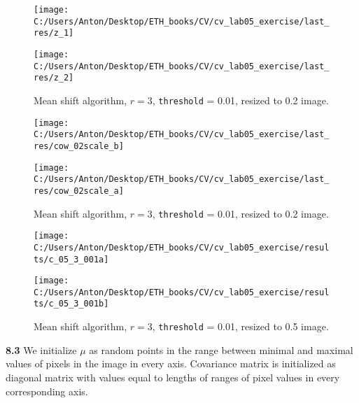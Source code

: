 \documentclass{report}
\begin{document}
\begin{figure}[h!]
	\begin{center}
		\begin{minipage}[h]{0.49\linewidth}
			\texttt{[image: C:/Users/Anton/Desktop/ETH\_books/CV/cv\_lab05\_exercise/last\_res/z\_1]}
			
		\end{minipage}
		\hfill
		\begin{minipage}[h]{0.49\linewidth}
			\texttt{[image: C:/Users/Anton/Desktop/ETH\_books/CV/cv\_lab05\_exercise/last\_res/z\_2]}
			
		\end{minipage}
	\caption{Mean shift algorithm, $r=3$, \texttt{threshold} = 0.01, resized to 0.2 image.}
	\end{center}
\end{figure}
\begin{figure}[h!]
	\begin{center}
		\begin{minipage}[h]{0.49\linewidth}
			\texttt{[image: C:/Users/Anton/Desktop/ETH\_books/CV/cv\_lab05\_exercise/last\_res/cow\_02scale\_b]}			
		\end{minipage}
		\hfill
		\begin{minipage}[h]{0.45\linewidth}
			\texttt{[image: C:/Users/Anton/Desktop/ETH\_books/CV/cv\_lab05\_exercise/last\_res/cow\_02scale\_a]}	
		\end{minipage}
		\caption{Mean shift algorithm, $r=3$, \texttt{threshold} = 0.01, resized to 0.2 image.}
	\end{center}
\end{figure}
\begin{figure}[h!]
	\begin{center}
		\begin{minipage}[h]{0.49\linewidth}
			\texttt{[image: C:/Users/Anton/Desktop/ETH\_books/CV/cv\_lab05\_exercise/results/c\_05\_3\_001a]}
		\end{minipage}
		\hfill
		\begin{minipage}[h]{0.49\linewidth}
			\texttt{[image: C:/Users/Anton/Desktop/ETH\_books/CV/cv\_lab05\_exercise/results/c\_05\_3\_001b]}
		\end{minipage}
	\caption{Mean shift algorithm, $r=3$, \texttt{threshold} = 0.01, resized to 0.5 image.}
	\end{center}
\end{figure}
\fi
\textbf{8.3}
We initialize $\mu$ as random points in the range between minimal and maximal values of pixels in the image in every axis. Covariance matrix is initialized as diagonal matrix with values equal to lengths of ranges of pixel values in every corresponding axis.
\end{document}

